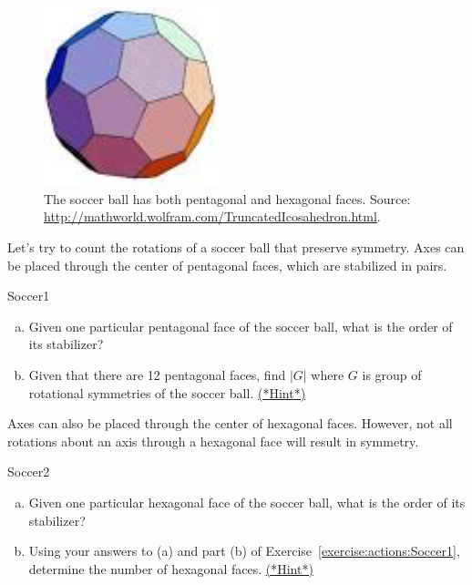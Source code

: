 \begin{figure}[ht]
\begin{center}
\includegraphics[width=2in]{images/Soccerball.png}
\caption{The soccer ball has both pentagonal and  hexagonal faces.  Source: \url{http://mathworld.wolfram.com/TruncatedIcosahedron.html}.
}
\label{fig:Soccer}
\end{center}
\end{figure}

Let's try to count the rotations of a soccer ball that preserve symmetry.  Axes can be placed through the center of pentagonal faces, which are stabilized in pairs. 

\begin{exercise}{Soccer1}
\begin{enumerate}[(a)]
\item
Given one particular pentagonal face of the soccer ball, what is the order of its stabilizer?
\item
Given that there are 12 pentagonal faces, find $|G|$ where $G$ is  group of rotational symmetries of the soccer ball.
\hyperref[sec:actions:hints]{(*Hint*)}
\end{enumerate}
\end {exercise}

 Axes can also be placed through the center of hexagonal faces.  However, not all rotations about an axis through a hexagonal face will result in symmetry.

\begin{exercise}{Soccer2}
\begin{enumerate}[(a)]
\item
Given one particular hexagonal face of the soccer ball, what is the order of its stabilizer?
\item
Using your answers to (a) and part (b) of Exercise~\ref{exercise:actions:Soccer1}, determine the number of hexagonal faces. \hyperref[sec:actions:hints]{(*Hint*)}
\end{enumerate}
\end {exercise}

